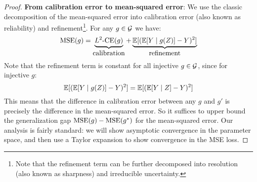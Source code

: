 \begin{proof}

\textbf{From calibration error to mean-squared error}: We use the classic decomposition of the mean-squared error into calibration error (also known as reliability) and refinement\footnote{Note that the refinement term can be further decomposed into resolution (also known as sharpness) and irreducible uncertainty.}. For any $g \in \mathcal{G}{}$ we have:
\[ \textup{MSE}(g) = \underbrace{L^2\textup{-CE}(g)}_{\mbox{calibration}} + \underbrace{\mathbb{E}[(\mathbb{E}[Y \mid g(Z)] - Y)^2]}_{\mbox{refinement}} \]
Note that the refinement term is constant for all injective $g \in \mathcal{G}{}$, since for injective $g$:
\[ \mathbb{E}[(\mathbb{E}[Y \mid g(Z)] - Y)^2] = \mathbb{E}[(\mathbb{E}[Y \mid Z] - Y)^2] \]
This means that the difference in calibration error between any $g$ and $g'$ is precisely the difference in the mean-squared error. So it suffices to upper bound the generalization gap $\textup{MSE}(g) - \textup{MSE}(g^*)$ for the mean-squared error. Our analysis is fairly standard: we will show asymptotic convergence in the parameter space, and then use a Taylor expansion to show convergence in the MSE loss.


\end{proof}
